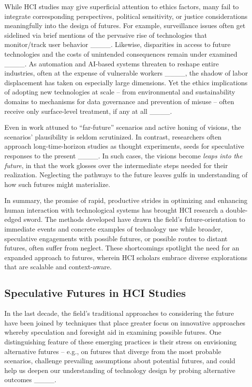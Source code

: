 While HCI studies may give superficial attention to ethics factors, many fail to integrate corresponding perspectives, political sensitivity, or justice considerations meaningfully into the design of futures. For example, surveillance issues often get sidelined via brief mentions of the pervasive rise of technologies that monitor/track user behavior ____. Likewise, disparities in access to future technologies and the costs of unintended consequences remain under examined ____. As automation and AI-based systems threaten to reshape entire industries, often at the expense of vulnerable workers ____, the shadow of labor displacement has taken on especially large dimensions. Yet the ethics implications of adopting new technologies at scale -- from environmental and sustainability domains to mechanisms for data governance and prevention of misuse -- often receive only surface-level treatment, if any at all ____.


Even in work attuned to ``far-future'' scenarios and active honing of visions, the scenarios' plausibility is seldom scrutinized. In contrast, researchers often approach long-time-horizon studies as thought experiments, seeds for speculative responses to the present ____. In such cases, the visions become \emph{leaps into the future}, in that the work glosses over the intermediate steps needed for their realization. Neglecting the pathways to the future leaves gulfs in understanding of how such futures might materialize.      

In summary, the promise of rapid, productive strides in optimizing and enhancing human interaction with technological systems has brought HCI research a double-edged sword. The methods developed have drawn the field's future-orientation to immediate events and concrete examples of technology use while broader, speculative engagements with possible futures, or possible routes to distant futures, often suffer from neglect. These shortcomings spotlight the need for an expanded approach to futures, wherein HCI scholars embrace diverse explorations that are scalable and context-aware.


\subsection{Speculative Futures in HCI Studies} \label{sec:speculative-futures-HCI} 
In the last decade, the field's traditional approaches to considering the future have been joined by techniques that place greater focus on innovative approaches whereby speculation and foresight aid in examining possible futures. One distinguishing feature of these emerging practices is their stress on envisioning alternative futures -- e.g., on futures that diverge from the most probable scenarios, challenge prevailing assumptions about potential futures, and could help us deepen our understanding of technology design by probing alternative outcomes ____.  


